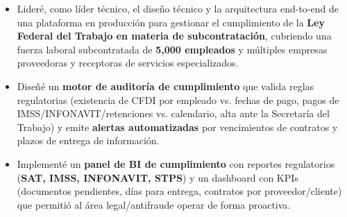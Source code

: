 {
\begin{itemize}
    \item Lideré, como líder técnico, el diseño técnico y la arquitectura end-to-end de una plataforma en producción para gestionar el cumplimiento de la \textbf{Ley Federal del Trabajo en materia de subcontratación}, cubriendo una fuerza laboral subcontratada de \textbf{5,000 empleados} y múltiples empresas proveedoras y receptoras de servicios especializados.
    \item Diseñé un \textbf{motor de auditoría de cumplimiento} que valida reglas regulatorias (existencia de CFDI por empleado vs. fechas de pago, pagos de IMSS/INFONAVIT/retenciones vs. calendario, alta ante la Secretaría del Trabajo) y emite \textbf{alertas automatizadas} por vencimientos de contratos y plazos de entrega de información.
    \item Implementé un \textbf{panel de BI de cumplimiento} con reportes regulatorios (\textbf{SAT, IMSS, INFONAVIT, STPS}) y un dashboard con KPIs (documentos pendientes, días para entrega, contratos por proveedor/cliente) que permitió al área legal/antifraude operar de forma proactiva.
\end{itemize}
}

